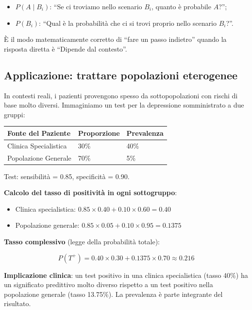\documentclass[
  italian,
  letterpaper,
  a4paper,
  11pt,
  open=any]{scrbook}
\newcounter{none} %
\providecommand{\tightlist}{%
  \setlength{\itemsep}{0pt}\setlength{\parskip}{0pt}}
\theoremstyle{plain}
\theoremstyle{definition}
\theoremstyle{definition}
\theoremstyle{remark}
\begin{document}
\begin{itemize}
\tightlist
\item
  \(P(A \mid B_i)\): ``Se ci troviamo nello scenario \(B_i\), quanto è
  probabile \(A\)?'';
\item
  \(P(B_i)\): ``Qual è la probabilità che ci si trovi proprio nello
  scenario \(B_i\)?''.
\end{itemize}

È il modo matematicamente corretto di ``fare un passo indietro'' quando
la risposta diretta è ``Dipende dal contesto''.

\subsection{Applicazione: trattare popolazioni
eterogenee}\label{applicazione-trattare-popolazioni-eterogenee}

In contesti reali, i pazienti provengono spesso da sottopopolazioni con
rischi di base molto diversi. Immaginiamo un test per la depressione
somministrato a due gruppi:

{\def\LTcaptype{none} %
\begin{longtable}[]{@{}lll@{}}
\toprule\noalign{}
Fonte del Paziente & Proporzione & Prevalenza \\
\midrule\noalign{}
\endhead
\bottomrule\noalign{}
\endlastfoot
Clinica Specialistica & 30\% & 40\% \\
Popolazione Generale & 70\% & 5\% \\
\end{longtable}
}

Test: sensibilità = 0.85, specificità = 0.90.

\textbf{Calcolo del tasso di positività in ogni sottogruppo}:

\begin{itemize}
\tightlist
\item
  Clinica specialistica: \(0.85 \times 0.40 + 0.10 \times 0.60 = 0.40\)
\item
  Popolazione generale: \(0.85 \times 0.05 + 0.10 \times 0.95 = 0.1375\)
\end{itemize}

\textbf{Tasso complessivo} (legge della probabilità totale):

\[
P(T^+) = 0.40 \times 0.30 + 0.1375 \times 0.70 \approx 0.216
\]

\textbf{Implicazione clinica}: un test positivo in una clinica
specialistica (tasso 40\%) ha un significato predittivo molto diverso
rispetto a un test positivo nella popolazione generale (tasso 13.75\%).
La prevalenza è parte integrante del risultato.
\end{document}
